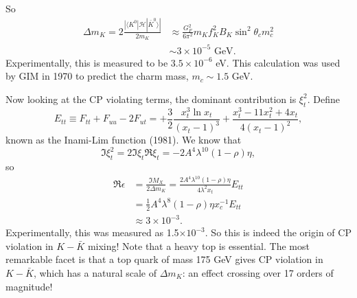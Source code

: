 So 
\begin{equation}
\begin{split}
\Delta m_K = 2\frac{|\langle K^0|\mathcal{H}|\bar{K}^0\rangle |}{2m_K} &\approx \frac{G_F^2}{6\pi^2}m_K f_K^2 B_K\sin^2\theta_c m_c^2 \\
&\sim 3\times 10^{-5} \text{ GeV}.
\end{split}
\end{equation}
Experimentally, this is measured to be $3.5 \times 10^{-6}$ eV. This calculation was used by GIM in 1970 to predict the charm mass, $m_c \sim 1.5$ GeV. 

Now looking at the CP violating terms, the dominant contribution is $\xi_t^2$. Define
\begin{equation}
E_{tt} \equiv F_{tt} + F_{uu} - 2F_{ut} = + \frac{3}{2} \frac{x_t^3 \ln x_t}{(x_t-1)^3} + \frac{x_t^3 - 11x_t^2 + 4x_t}{4(x_t-1)^2},
\end{equation}
known as the Inami-Lim function (1981). We know that
\begin{equation}
\Im \xi_t^2 = 2\Im \xi_t \Re \xi_t = -2A^4 \lambda^{10}(1-\rho)\eta,
\end{equation}
so
\begin{equation}
\begin{split}
\Re \epsilon &= \frac{\Im M_X}{2 \Delta m_K} = \frac{2 A^4 \lambda^{10}(1-\rho)\eta}{4\lambda^2 x_t} E_{tt}\\
&= \frac{1}{2} A^4 \lambda^8 (1-\rho) \eta x_c^{-1} E_{tt} \\
&\approx 3\times 10^{-3}.
\end{split}
\end{equation}
Experimentally, this was measured as 1.5$\times 10^{-3}$. So this is indeed the origin of CP violation in $K-\bar{K}$ mixing! Note that a heavy top is essential. The most remarkable facet is that a top quark of mass 175 GeV gives CP violation in $K-\bar{K}$, which has a natural scale of $\Delta m_K$: an effect crossing over 17 orders of magnitude!
%
